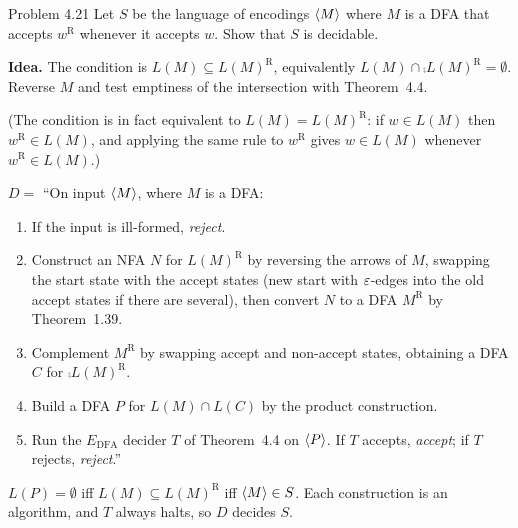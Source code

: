 \begin{question}{Problem 4.21}
Let $S$ be the language of encodings $\langle M\rangle$ where $M$ is a DFA that accepts $w^{\mathrm{R}}$ whenever it accepts $w$. Show that $S$ is decidable.
\end{question}
\begin{soln}
\textbf{Idea.} The condition is $L(M)\subseteq L(M)^{\mathrm{R}}$, equivalently $L(M)\cap\comp{L(M)^{\mathrm{R}}}=\emptyset$. Reverse $M$ and test emptiness of the intersection with Theorem~4.4.

(The condition is in fact equivalent to $L(M)=L(M)^{\mathrm{R}}$: if $w\in L(M)$ then $w^{\mathrm{R}}\in L(M)$, and applying the same rule to $w^{\mathrm{R}}$ gives $w\in L(M)$ whenever $w^{\mathrm{R}}\in L(M)$.)

$D=$ ``On input $\langle M\rangle$, where $M$ is a DFA:
\begin{enumerate}
\item If the input is ill-formed, \emph{reject}.
\item Construct an NFA $N$ for $L(M)^{\mathrm{R}}$ by reversing the arrows of $M$, swapping the start state with the accept states (new start with $\varepsilon$-edges into the old accept states if there are several), then convert $N$ to a DFA $M^{\mathrm{R}}$ by Theorem~1.39.
\item Complement $M^{\mathrm{R}}$ by swapping accept and non-accept states, obtaining a DFA $C$ for $\comp{L(M)^{\mathrm{R}}}$.
\item Build a DFA $P$ for $L(M)\cap L(C)$ by the product construction.
\item Run the $E_{\mathrm{DFA}}$ decider $T$ of Theorem~4.4 on $\langle P\rangle$. If $T$ accepts, \emph{accept}; if $T$ rejects, \emph{reject}.''
\end{enumerate}

$L(P)=\emptyset$ iff $L(M)\subseteq L(M)^{\mathrm{R}}$ iff $\langle M\rangle\in S$. Each construction is an algorithm, and $T$ always halts, so $D$ decides $S$.
\end{soln}

